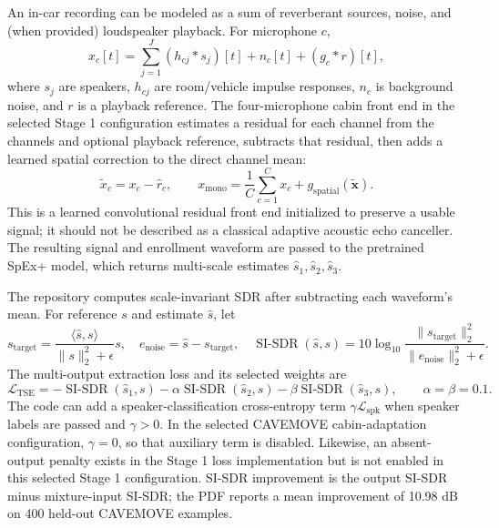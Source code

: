 An in-car recording can be modeled as a sum of reverberant sources, noise, and (when provided) loudspeaker playback. For microphone $c$,
\begin{equation}
  x_c[t]=\sum_{j=1}^{J}(h_{cj}*s_j)[t]+n_c[t]+(g_c*r)[t],
  \label{eq:cabin-mixture}
\end{equation}
where $s_j$ are speakers, $h_{cj}$ are room/vehicle impulse responses, $n_c$ is background noise, and $r$ is a playback reference. The four-microphone cabin front end in the selected Stage 1 configuration estimates a residual for each channel from the channels and optional playback reference, subtracts that residual, then adds a learned spatial correction to the direct channel mean:
\begin{equation}
  \widetilde{x}_c=x_c-\widehat{r}_c,\qquad
  x_{\mathrm{mono}}=\frac{1}{C}\sum_{c=1}^{C}x_c+g_{\mathrm{spatial}}(\widetilde{\mathbf{x}}).
  \label{eq:cabin-frontend}
\end{equation}
This is a learned convolutional residual front end initialized to preserve a usable signal; it should not be described as a classical adaptive acoustic echo canceller. The resulting signal and enrollment waveform are passed to the pretrained SpEx+ model, which returns multi-scale estimates $\hat{s}_1,\hat{s}_2,\hat{s}_3$.

The repository computes scale-invariant SDR after subtracting each waveform's mean. For reference $s$ and estimate $\hat{s}$, let
\begin{equation}
  s_{\mathrm{target}}=\frac{\langle\hat{s},s\rangle}{\lVert s\rVert_2^2+\epsilon}s,
  \quad e_{\mathrm{noise}}=\hat{s}-s_{\mathrm{target}},
  \quad \operatorname{SI\text{-}SDR}(\hat{s},s)=10\log_{10}\frac{\lVert s_{\mathrm{target}}\rVert_2^2}{\lVert e_{\mathrm{noise}}\rVert_2^2+\epsilon}.
  \label{eq:sisdr}
\end{equation}
The multi-output extraction loss and its selected weights are
\begin{equation}
  \mathcal{L}_{\mathrm{TSE}}=-\operatorname{SI\text{-}SDR}(\hat{s}_1,s)
  -\alpha\operatorname{SI\text{-}SDR}(\hat{s}_2,s)
  -\beta\operatorname{SI\text{-}SDR}(\hat{s}_3,s),\qquad \alpha=\beta=0.1.
  \label{eq:tse-loss}
\end{equation}
The code can add a speaker-classification cross-entropy term $\gamma\mathcal{L}_{\mathrm{spk}}$ when speaker labels are passed and $\gamma>0$. In the selected CAVEMOVE cabin-adaptation configuration, $\gamma=0$, so that auxiliary term is disabled. Likewise, an absent-output penalty exists in the Stage 1 loss implementation but is not enabled in this selected Stage 1 configuration. SI-SDR improvement is the output SI-SDR minus mixture-input SI-SDR; the PDF reports a mean improvement of 10.98 dB on 400 held-out CAVEMOVE examples.

